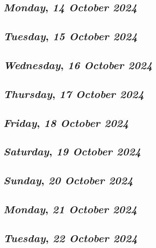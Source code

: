 \def\day{\textit{14 October 2024}}
\def\weekday{\textit{Monday}}
\subsection*{\weekday, \day}

\def\day{\textit{15 October 2024}}
\def\weekday{\textit{Tuesday}}
\subsection*{\weekday, \day}

\def\day{\textit{16 October 2024}}
\def\weekday{\textit{Wednesday}}
\subsection*{\weekday, \day}

\def\day{\textit{17 October 2024}}
\def\weekday{\textit{Thursday}}
\subsection*{\weekday, \day}

\def\day{\textit{18 October 2024}}
\def\weekday{\textit{Friday}}
\subsection*{\weekday, \day}

\def\day{\textit{19 October 2024}}
\def\weekday{\textit{Saturday}}
\subsection*{\weekday, \day}

\def\day{\textit{20 October 2024}}
\def\weekday{\textit{Sunday}}
\subsection*{\weekday, \day}

\def\day{\textit{21 October 2024}}
\def\weekday{\textit{Monday}}
\subsection*{\weekday, \day}

\def\day{\textit{22 October 2024}}
\def\weekday{\textit{Tuesday}}
\subsection*{\weekday, \day}

